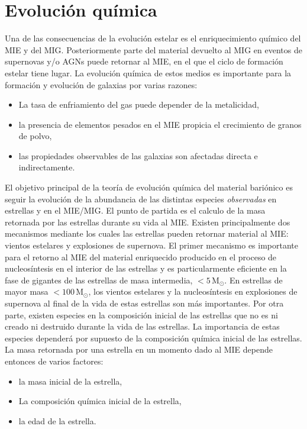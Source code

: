 \documentclass{article}
\begin{document}
\section{Evolución química}
%
Una de las consecuencias de la evolución estelar es el enriquecimiento químico del MIE y del MIG.
Posteriormente parte del material devuelto al MIG en eventos de supernovas y/o AGNs puede retornar
al MIE, en el que el ciclo de formación estelar tiene lugar. La evolución química de estos medios es
importante para la formación y evolución de galaxias por varias razones:
%
\begin{itemize}
\item La tasa de enfriamiento del gas puede depender de la metalicidad,
\item la presencia de elementos pesados en el MIE propicia el crecimiento de granos de polvo,
\item las propiedades observables de las galaxias son afectadas directa e indirectamente.
\end{itemize}
%
El objetivo principal de la teoría de evolución química del material bariónico es seguir la
evolución de la abundancia de las distintas especies \emph{observadas} en estrellas y en el MIE/MIG.
El punto de partida es el calculo de la masa retornada por las estrellas durante su vida al MIE.
Existen principalmente dos mecanismos mediante los cuales las estrellas pueden retornar material al
MIE: vientos estelares y explosiones de supernova. El primer mecanismo es importante para el retorno
al MIE del material enriquecido producido en el proceso de nucleosíntesis en el interior de las
estrellas y es particularmente eficiente en la fase de gigantes de las estrellas de masa intermedia,
$<5\,$M$_\odot$. En estrellas de mayor masa $<100\,$M$_\odot$, los vientos estelares y la
nucleosíntesis en explosiones de supernova al final de la vida de estas estrellas son más
importantes. Por otra parte, existen especies en la composición inicial de las estrellas que no es
ni creado ni destruido durante la vida de las estrellas. La importancia de estas especies dependerá
por supuesto de la composición química inicial de las estrellas. La masa retornada por una estrella
en un momento dado al MIE depende entonces de varios factores:
%
\begin{itemize}
\item la masa inicial de la estrella,
\item La composición química inicial de la estrella,
\item la edad de la estrella.
\end{itemize}
\end{document}
